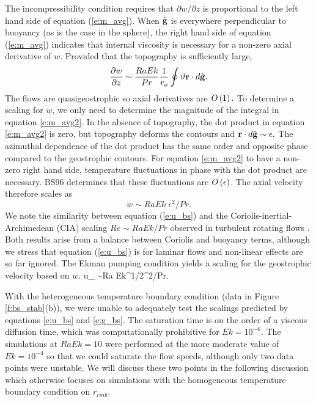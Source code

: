The incompressibility condition requires that $\partial w/\partial z$ is proportional to the left hand side of equation (\ref{e:m_avg}).
When ${\hat{\mathbf{g}}}$ is everywhere perpendicular to buoyancy (as is the case in the sphere), the right hand side of equation (\ref{e:m_avg}) indicates that internal viscosity is necessary for a non-zero axial derivative of $w$. 
Provided that the topography is sufficiently large,
\begin{equation}
	\frac{\partial w}{\partial z} \sim\frac{Ra Ek }{Pr}\frac{1}{r_{o}}\oint \vartheta \mathbf{r}\cdot d{\hat{\mathbf{g}}}.
	\label{e:m_avg2}
\end{equation}
The flows are quasigeostrophic so  axial derivatives are $O\left ( 1\right ).$ To determine a scaling for $w$, we only need to determine the magnitude of the integral in equation \eqref{e:m_avg2}. In the absence of topography, the dot product in equation \eqref{e:m_avg2} is zero, but topography deforms the contours and $\mathbf{r}\cdot d{\hat{\mathbf{g}}}\sim\epsilon .$ 
The azimuthal dependence of the dot product has the same order and opposite phase compared to the geostrophic contours.
For equation \eqref{e:m_avg2} to have a non-zero right hand side, temperature fluctuations in phase with the dot product are necessary. BS96 determines that these fluctuations are $O\left ( \epsilon\right ) $.
The axial velocity therefore scales as
\begin{equation}
w \sim Ra Ek\; \epsilon^{2}/ Pr. 
\label{e:u_bs}
\end{equation}We note the similarity between equation (\ref{e:u_bs}) and the Coriolis-inertial-Archimedean (CIA) scaling $Re\sim RaEk/Pr$ observed in turbulent rotating flows \citep[e.g.][]{cG19}. 
Both results arise from a balance between Coriolis and buoyancy terms, although we stress that equation (\ref{e:u_bs}) is for laminar flows and non-linear effects are so far ignored.
The Ekman pumping condition \citep[e.g.][]{hG68} yields a scaling for the geostrophic velocity based on $w.$
\be
u_{\gchar} \sim Ra Ek^{1/2}\epsilon^{2}/Pr.
\label{e:g_bs}
\ee



With the heterogeneous temperature boundary condition (data in Figure \ref{f:bs_stab}(b)), we were unable to adequately test the scalings predicted by equations \eqref{e:u_bs} and \eqref{e:g_bs}. The saturation time is on the order of a viscous diffusion time, which was computationally prohibitive for $Ek=10^{-6}.$  
The simulations at $RaEk=10$ were performed at the more moderate value of $Ek=10^{-4}$ so that we could saturate the flow speeds, although only two data points were unstable. We will discuss these two points in the following discussion which otherwise focuses on simulations with the homogeneous temperature boundary condition on $r_{cmb}$. 

